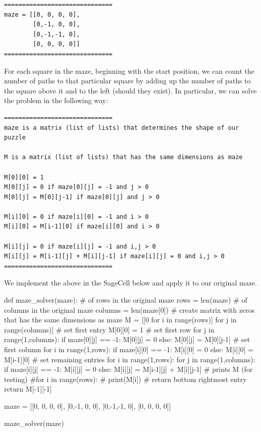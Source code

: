 \documentclass{ximera}
\begin{document}
\begin{verbatim}
==============================
maze = [[0, 0, 0, 0],
        [0,-1, 0, 0],
        [0,-1,-1, 0],
        [0, 0, 0, 0]]
==============================
\end{verbatim}

For each square in the maze, beginning with the start position, we can count the number of paths to that particular square by adding up the number of paths to the square above it and to the left (should they exist). In particular, we can solve the problem in the following way:
\begin{verbatim}
==============================
maze is a matrix (list of lists) that determines the shape of our puzzle

M is a matrix (list of lists) that has the same dimensions as maze

M[0][0] = 1
M[0][j] = 0 if maze[0][j] = -1 and j > 0
M[0][j] = M[0][j-1] if maze[0][j] and j > 0

M[i][0] = 0 if maze[i][0] = -1 and i > 0
M[i][0] = M[i-1][0] if maze[i][0] and i > 0

M[i][j] = 0 if maze[i][j] = -1 and i,j > 0
M[i][j] = M[i-1][j] + M[i][j-1] if maze[i][j] = 0 and i,j > 0
==============================
\end{verbatim}

We implement the above in the SageCell below and apply it to our original maze.
\begin{sageCell}
def maze_solver(maze):
        # of rows in the original maze
        rows = len(maze)
        # of columns in the original maze
        columns = len(maze[0])
        # create matrix with zeros that has the same dimensions as maze
        M = [[0 for i in range(rows)] for j in range(columns)]
        # set first entry
        M[0][0] = 1
        # set first row
        for j in range(1,columns):
                if maze[0][j] == -1:
                        M[0][j] = 0
                else:
                        M[0][j] = M[0][j-1]
        # set first column
        for i in range(1,rows):
                if maze[i][0] == -1:
                        M[i][0] = 0
                else:
                        M[i][0] = M[i-1][0]
        # set remaining entries
        for i in range(1,rows):
                for j in range(1,columns):
                        if maze[i][j] == -1:
                                M[i][j] = 0
                        else:
                                M[i][j] = M[i-1][j] + M[i][j-1]
        # prints M (for testing)
        #for i in range(rows):
        #    print(M[i])
        # return bottom rightmost entry
        return M[-1][-1]

maze = [[0, 0, 0, 0],
        [0,-1, 0, 0],
        [0,-1,-1, 0],
        [0, 0, 0, 0]]

maze_solver(maze)
\end{sageCell}
\end{document}
